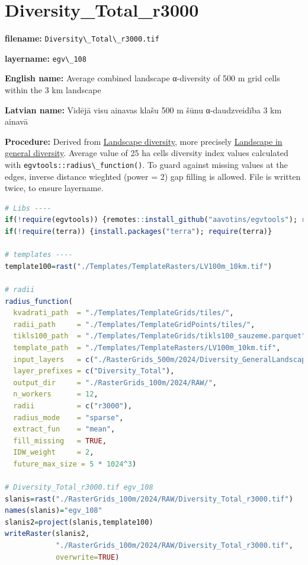 \documentclass[
]{book}
\newcommand{\passthrough}[1]{#1}
\begin{document}
\section{Diversity\_Total\_r3000}\label{ch06.108}

\textbf{filename:} \passthrough{\lstinline!Diversity\_Total\_r3000.tif!}

\textbf{layername:} \passthrough{\lstinline!egv\_108!}

\textbf{English name:} Average combined landscape α-diversity of 500 m grid cells within the 3 km landscape

\textbf{Latvian name:} Vidējā visu ainavas klašu 500 m šūnu α-daudzveidība 3 km ainavā

\textbf{Procedure:} Derived from \hyperref[Ch05.04]{Landscape diversity}, more precisely
\hyperref[Ch05.04.01]{Landscape in general diversity}. Average value of 25 ha
cells diversity index values calculated with \passthrough{\lstinline!egvtools::radius\_function()!}. To
guard against missing values at the edges, inverse distance wieghted (power = 2)
gap filling is allowed. File is written twice, to ensure layername.

\begin{lstlisting}[language=R]
# Libs ----
if(!require(egvtools)) {remotes::install_github("aavotins/egvtools"); require(egvtools)}
if(!require(terra)) {install.packages("terra"); require(terra)}

# templates ----
template100=rast("./Templates/TemplateRasters/LV100m_10km.tif")

# radii
radius_function(
  kvadrati_path  = "./Templates/TemplateGrids/tiles/",
  radii_path     = "./Templates/TemplateGridPoints/tiles/",
  tikls100_path  = "./Templates/TemplateGrids/tikls100_sauzeme.parquet",
  template_path  = "./Templates/TemplateRasters/LV100m_10km.tif",
  input_layers   = c("./RasterGrids_500m/2024/Diversity_GeneralLandscape_500x.tif"),
  layer_prefixes = c("Diversity_Total"),
  output_dir     = "./RasterGrids_100m/2024/RAW/",
  n_workers      = 12,
  radii          = c("r3000"),
  radius_mode    = "sparse",
  extract_fun    = "mean",
  fill_missing   = TRUE,
  IDW_weight     = 2,
  future_max_size = 5 * 1024^3)

# Diversity_Total_r3000.tif egv_108
slanis=rast("./RasterGrids_100m/2024/RAW/Diversity_Total_r3000.tif")
names(slanis)="egv_108"
slanis2=project(slanis,template100)
writeRaster(slanis2,
            "./RasterGrids_100m/2024/RAW/Diversity_Total_r3000.tif",
            overwrite=TRUE)
\end{lstlisting}
\end{document}
